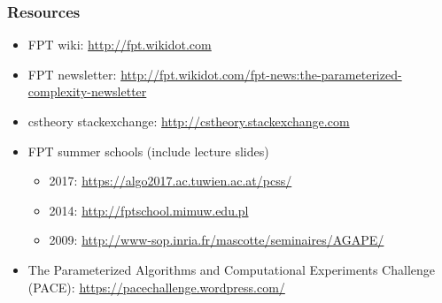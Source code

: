 \begin{frame}
 \frametitle{Resources}
 
 \begin{itemize}
  \item FPT wiki: \url{http://fpt.wikidot.com}
  \item FPT newsletter: \url{http://fpt.wikidot.com/fpt-news:the-parameterized-complexity-newsletter}
  \item cstheory stackexchange: \url{http://cstheory.stackexchange.com}
  \item FPT summer schools (include lecture slides)
  \begin{itemize}
  	\item 2017: \url{https://algo2017.ac.tuwien.ac.at/pcss/}
  	\item 2014: \url{http://fptschool.mimuw.edu.pl}
  	\item 2009: \url{http://www-sop.inria.fr/mascotte/seminaires/AGAPE/}
  \end{itemize}
  \item The Parameterized Algorithms and Computational Experiments Challenge (PACE): \url{https://pacechallenge.wordpress.com/}
 \end{itemize}

\end{frame}

%	
%
%

\begin{frame}[t, allowframebreaks]
\printbibliography
\end{frame}



